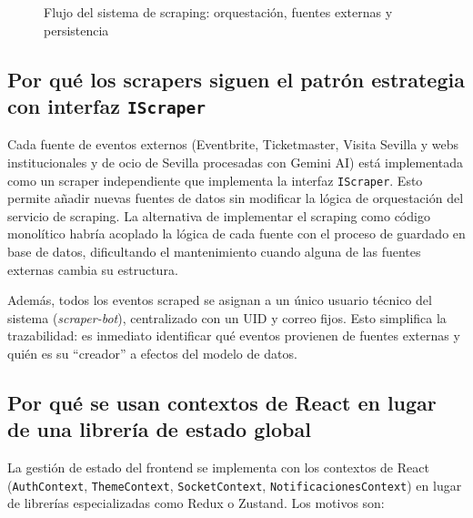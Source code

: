 \begin{figure}[H]
\caption{Flujo del sistema de scraping: orquestación, fuentes externas y persistencia}
\label{fig:flujo_scraping}
\end{figure}

\subsection{Por qué los scrapers siguen el patrón estrategia con interfaz \texttt{IScraper}}

Cada fuente de eventos externos (Eventbrite, Ticketmaster, Visita Sevilla y webs institucionales y de ocio de Sevilla procesadas con Gemini AI) está implementada como un scraper independiente que implementa la interfaz \texttt{IScraper}. Esto permite añadir nuevas fuentes de datos sin modificar la lógica de orquestación del servicio de scraping. La alternativa de implementar el scraping como código monolítico habría acoplado la lógica de cada fuente con el proceso de guardado en base de datos, dificultando el mantenimiento cuando alguna de las fuentes externas cambia su estructura.

Además, todos los eventos scraped se asignan a un único usuario técnico del sistema (\textit{scraper-bot}), centralizado con un UID y correo fijos. Esto simplifica la trazabilidad: es inmediato identificar qué eventos provienen de fuentes externas y quién es su ``creador'' a efectos del modelo de datos.

\subsection{Por qué se usan contextos de React en lugar de una librería de estado global}

La gestión de estado del frontend se implementa con los contextos de React (\texttt{AuthContext}, \texttt{ThemeContext}, \texttt{SocketContext}, \texttt{NotificacionesContext}) en lugar de librerías especializadas como Redux o Zustand. Los motivos son:

